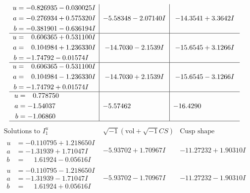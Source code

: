 \documentclass[1p]{elsarticle_modified}
\theoremstyle{definition}
\newcommand{\I}{\sqrt{-1}}
\begin{document}
$$\begin{array}{c|c|c}
\begin{aligned}
u &= -0.826935 - 0.030025 I \\
a &= -0.276934 + 0.575320 I \\
b &= -0.381901 - 0.636194 I\end{aligned}
 & -5.58348 - 2.07140 I & -14.3541 + 3.3642 I \\ \hline\begin{aligned}
u &= \phantom{-}0.606365 + 0.531100 I \\
a &= \phantom{-}0.104984 + 1.236330 I \\
b &= -1.74792 - 0.01574 I\end{aligned}
 & -14.7030 - 2.1539 I & -15.6545 + 3.1266 I \\ \hline\begin{aligned}
u &= \phantom{-}0.606365 - 0.531100 I \\
a &= \phantom{-}0.104984 - 1.236330 I \\
b &= -1.74792 + 0.01574 I\end{aligned}
 & -14.7030 + 2.1539 I & -15.6545 - 3.1266 I \\ \hline\begin{aligned}
u &= \phantom{-}0.778750\phantom{ +0.000000I} \\
a &= -1.54037\phantom{ +0.000000I} \\
b &= -1.06860\phantom{ +0.000000I}\end{aligned}
 & -5.57462\phantom{ +0.000000I} & -16.4290\phantom{ +0.000000I}\\
 \hline 
 \end{array}$$\newpage$$\begin{array}{c|c|c}  
\text{Solutions to }I^u_{1}& \I (\text{vol} + \sqrt{-1}CS) & \text{Cusp shape}\\
 \hline 
\begin{aligned}
u &= -0.110795 + 1.218650 I \\
a &= -1.31939 + 1.71047 I \\
b &= \phantom{-}1.61924 - 0.05616 I\end{aligned}
 & -5.93702 + 1.70967 I & -11.27232 + 1.90310 I \\ \hline\begin{aligned}
u &= -0.110795 - 1.218650 I \\
a &= -1.31939 - 1.71047 I \\
b &= \phantom{-}1.61924 + 0.05616 I\end{aligned}
 & -5.93702 - 1.70967 I & -11.27232 - 1.90310 I \\ \hline\begin{aligned}

\end{aligned}
\end{array}$$
\end{document}
